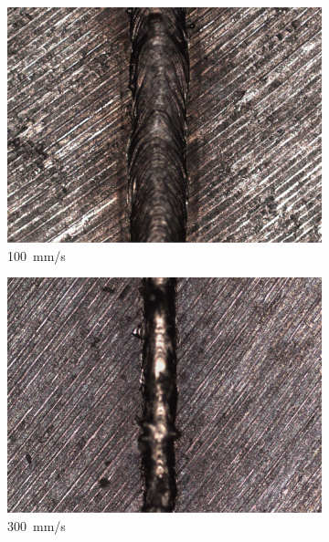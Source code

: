 \documentclass{article}
\begin{document}
\begin{figure}
    \centering
    \begin{subfigure}[b]{0.24\textwidth}
        \includegraphics[width=\textwidth]{experiment/photos/90W_V100}
        \caption{\SI{100}{mm/s}}
    \end{subfigure}\:
    \begin{subfigure}[b]{0.24\textwidth}
        \includegraphics[width=\textwidth]{experiment/photos/90W_V300}
        \caption{\SI{300}{mm/s}}
    \end{subfigure}\:
    \begin{subfigure}[b]{0.24\textwidth}

\end{subfigure}
\end{figure}
\end{document}
